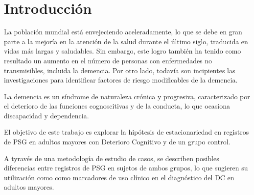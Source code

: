 \chapter{Introducci\'on}

La poblaci\'on mundial est\'a envejeciendo aceleradamente, lo que se debe en gran parte a la 
mejor\'ia en la atenci\'on de la salud durante el \'ultimo siglo, traducida en vidas m\'as 
largas y saludables. Sin embargo, este logro tambi\'en ha tenido como resultado un aumento en el 
n\'umero de personas con enfermedades no transmisibles, incluida la demencia.
Por otro lado, todav\'ia son incipientes las investigaciones para identificar 
factores de riesgo modificables de la demencia.
\cite{PlanAlzheimer04}




La demencia es un síndrome de naturaleza cr\'onica y progresiva, caracterizado 
por el deterioro de las funciones cognoscitivas y de la conducta, lo que ocasiona 
discapacidad y dependencia.
\cite{PlanAlzheimer04}


El objetivo de este trabajo es explorar la hip\'otesis de estacionariedad en registros
de PSG en adultos mayores con Deterioro Cognitivo y de
un grupo control.

A tyrav\'es de una metodolog\'ia de estudio de casos, se describen posibles diferencias entre 
registros 
de PSG en sujetos de ambos grupos, lo que sugieren su utilizaci\'on como
como marcadores de uso cl\'inico en el diagn\'ostico del DC en adultos mayores.

%
%
%


